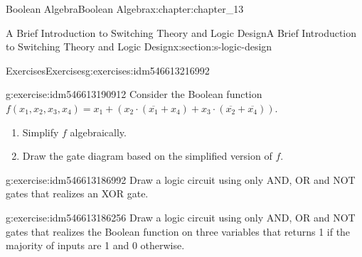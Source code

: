\documentclass[oneside,10pt,]{book}
\numberwithin{equation}{section}
\begin{document}
\begin{chapterptx}{Boolean Algebra}{}{Boolean Algebra}{}{}{x:chapter:chapter_13}
\begin{sectionptx}{A Brief Introduction to Switching Theory and Logic Design}{}{A Brief Introduction to Switching Theory and Logic Design}{}{}{x:section:s-logic-design}
\begin{exercises-subsection}{Exercises}{}{Exercises}{}{}{g:exercises:idm546613216992}
\begin{divisionexercise}{6}{}{}{g:exercise:idm546613190912}
Consider the Boolean function \(f\left(x_1, x_2, x_3, x_4\right)=x_1 + \left(x_2 \cdot  \left(\overline{x_1} + x_4\right) + x_3 \cdot  \left(\overline{x_2} + \overline{x_4}\right)\right).\)%
\par
%
\begin{enumerate}[label=(\alph*)]
\item{}Simplify \(f\) algebraically.%
\item{}Draw the gate diagram based on the simplified version of \(f\).%
\end{enumerate}
%
\end{divisionexercise}%
\begin{divisionexercise}{7}{}{}{g:exercise:idm546613186992}%
Draw a logic circuit using only AND, OR and NOT gates that realizes an XOR gate.%
\end{divisionexercise}%
\begin{divisionexercise}{8}{}{}{g:exercise:idm546613186256}%
Draw a logic circuit using only AND, OR and NOT gates that realizes the Boolean function on three variables that returns 1 if the majority of inputs are 1 and 0 otherwise.%
\end{divisionexercise}%
\end{exercises-subsection}
\end{sectionptx}
\end{chapterptx}
%
%
\typeout{************************************************}
\typeout{************************************************}
%
\end{document}
